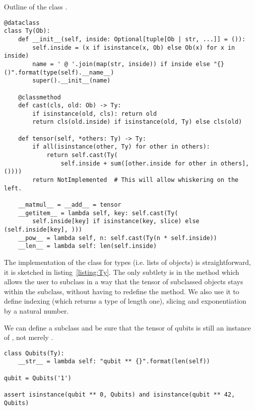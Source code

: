 \begin{python}\label{listing:Ty}
{\normalfont Outline of the class .}
\begin{verbatim}
@dataclass
class Ty(Ob):
    def __init__(self, inside: Optional[tuple[Ob | str, ...]] = ()):
        self.inside = (x if isinstance(x, Ob) else Ob(x) for x in inside)
        name = ' @ '.join(map(str, inside)) if inside else "{}()".format(type(self).__name__)
        super().__init__(name)

    @classmethod
    def cast(cls, old: Ob) -> Ty:
        if isinstance(old, cls): return old
        return cls(old.inside) if isinstance(old, Ty) else cls(old)

    def tensor(self, *others: Ty) -> Ty:
        if all(isinstance(other, Ty) for other in others):
            return self.cast(Ty(
                self.inside + sum([other.inside for other in others], ())))
        return NotImplemented  # This will allow whiskering on the left.

    __matmul__ = __add__ = tensor
    __getitem__ = lambda self, key: self.cast(Ty(
        self.inside[key] if isinstance(key, slice) else (self.inside[key], )))
    __pow__ = lambda self, n: self.cast(Ty(n * self.inside))
    __len__ = lambda self: len(self.inside)
\end{verbatim}
\end{python}

The implementation of the class  for types (i.e. lists of objects) is straightforward, it is sketched in listing~\ref{listing:Ty}.
The only subtlety is in the method  which allows the user to subclass  in a way that the tensor of subclassed objects stays within the subclass, without having to redefine the  method.
We also use it to define indexing (which returns a type of length one), slicing and exponentiation by a natural number.

\begin{example}
We can define a  subclass and be sure that the tensor of qubits is still an instance of , not merely .

\begin{verbatim}
class Qubits(Ty):
    __str__ = lambda self: "qubit ** {}".format(len(self))

qubit = Qubits('1')

assert isinstance(qubit ** 0, Qubits) and isinstance(qubit ** 42, Qubits)
\end{verbatim}
\end{example}

